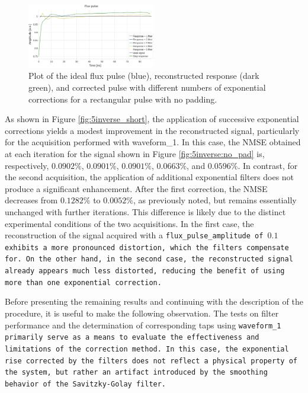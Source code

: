 \begin{figure}[h!]
    \centering
    \includegraphics[width=0.5\textwidth]{figures/png/Cryoscope/filters_long/5_inverse.png}
    \caption{Plot of the ideal flux pulse (blue), reconstructed response (dark green), and corrected pulse with different numbers of exponential corrections for a rectangular pulse with no padding.}
    \label{fig:5inverse:long}
\end{figure} 

As shown in Figure \ref{fig:5inverse_short}, the application of successive exponential corrections yields a modest improvement in the reconstructed signal, particularly for the acquisition performed with waveform\_1.
In this case, the NMSE obtained at each iteration for the signal shown in Figure \ref{fig:5inverse:no_pad} is, respectively, $0.0902\%$, $0.0901\%$, $0.0901\%$, $0.0663\%$, and $0.0596\%$.
In contrast, for the second acquisition, the application of additional exponential filters does not produce a significant enhancement.
After the first correction, the NMSE decreases from $0.1282\%$ to $0.0052\%$, as previously noted, but remains essentially unchanged with further iterations.
This difference is likely due to the distinct experimental conditions of the two acquisitions. 
In the first case, the reconstruction of the signal acquired with a \tt{flux\_pulse\_amplitude} of $0.1$ exhibits a more pronounced distortion, which the filters compensate for. 
On the other hand, in the second case, the reconstructed signal already appears much less distorted, reducing the benefit of using more than one exponential correction.

Before presenting the remaining results and continuing with the description of the procedure, it is useful to make the following observation.
The tests on filter performance and the determination of corresponding taps using \tt{waveform\_1} primarily serve as a means to evaluate the effectiveness and limitations of the correction method. 
In this case, the exponential rise corrected by the filters does not reflect a physical property of the system, but rather an artifact introduced by the smoothing behavior of the Savitzky-Golay filter.

